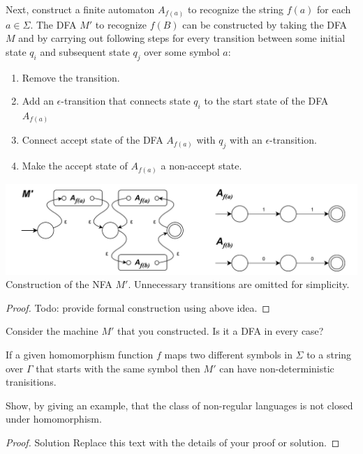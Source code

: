 \documentclass[11pt]{article}
\newenvironment{problem}[2][Problem]{\begin{trivlist}
\item[\hskip \labelsep {\bfseries #1}\hskip \labelsep {\bfseries #2.}]}{\end{trivlist}}
\begin{document}
Next, construct a finite automaton $A_{f(a)}$ to recognize the string $f(a)$ for each $a \in \Sigma$. The DFA $M'$ to recognize $f(B)$ can be constructed by taking the DFA $M$ and by carrying out following steps for every transition between some initial state $q_{i}$ and subsequent state $q_{j}$ over some symbol $a$:
\begin{enumerate}
\item Remove the transition.
\item Add an $\epsilon$-transition that connects state $q_{i}$ to the start state of the DFA $A_{f(a)}$
\item Connect accept state of the DFA $A_{f(a)}$ with $q_{j}$ with an $\epsilon$-transition.
\item Make the accept state of $A_{f(a)}$ a non-accept state.
\end{enumerate}

\begin{center}
\includegraphics[scale=0.8]{Figures/Problem1.66b.pdf} \\
Construction of the NFA $M'$. Unnecessary transitions are omitted for simplicity.
\end{center}

\begin{proof}
Todo: provide formal construction using above idea.
\end{proof}

Consider the machine $M'$ that you constructed. Is it a DFA in every case?

If a given homomorphism function $f$ maps two different symbols in $\Sigma$ to a string over $\Gamma$ that starts with the same symbol then $M'$ can have non-deterministic tranisitions.

\begin{problem}[Part]{b}
Show, by giving an example, that the class of non-regular languages is not
closed under homomorphism.
\end{problem}

\begin{proof}
Solution Replace this text with the details of your proof or solution.
\end{proof}
\end{document}
